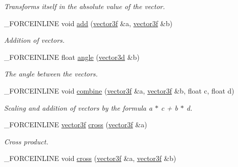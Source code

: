 \begin{DoxyCompactItemize}
\begin{DoxyCompactList}\small\item\em Transforms itself in the absolute value of the vector. \end{DoxyCompactList}\item 
\hypertarget{classbt_1_1vector3f_a5d6b329f5b2a2935d714a789af205f5a}{\-\_\-\-F\-O\-R\-C\-E\-I\-N\-L\-I\-N\-E void \hyperlink{classbt_1_1vector3f_a5d6b329f5b2a2935d714a789af205f5a}{add} (\hyperlink{classbt_1_1vector3f}{vector3f} \&a, \hyperlink{classbt_1_1vector3f}{vector3f} \&b)}\label{classbt_1_1vector3f_a5d6b329f5b2a2935d714a789af205f5a}

\begin{DoxyCompactList}\small\item\em Addition of vectors. \end{DoxyCompactList}\item 
\hypertarget{classbt_1_1vector3f_ae4e237c6a19867162c2dbfa2b7a16cfb}{\-\_\-\-F\-O\-R\-C\-E\-I\-N\-L\-I\-N\-E float \hyperlink{classbt_1_1vector3f_ae4e237c6a19867162c2dbfa2b7a16cfb}{angle} (\hyperlink{classbt_1_1vector3d}{vector3d} \&b)}\label{classbt_1_1vector3f_ae4e237c6a19867162c2dbfa2b7a16cfb}

\begin{DoxyCompactList}\small\item\em The angle between the vectors. \end{DoxyCompactList}\item 
\hypertarget{classbt_1_1vector3f_a82d7e9541cdad6f083b29c65e2d8a93a}{\-\_\-\-F\-O\-R\-C\-E\-I\-N\-L\-I\-N\-E void \hyperlink{classbt_1_1vector3f_a82d7e9541cdad6f083b29c65e2d8a93a}{combine} (\hyperlink{classbt_1_1vector3f}{vector3f} \&a, \hyperlink{classbt_1_1vector3f}{vector3f} \&b, float c, float d)}\label{classbt_1_1vector3f_a82d7e9541cdad6f083b29c65e2d8a93a}

\begin{DoxyCompactList}\small\item\em Scaling and addition of vectors by the formula a $\ast$ c + b $\ast$ d. \end{DoxyCompactList}\item 
\hypertarget{classbt_1_1vector3f_a2de99faae5d7418ad34cc9a8d6611c0d}{\-\_\-\-F\-O\-R\-C\-E\-I\-N\-L\-I\-N\-E \hyperlink{classbt_1_1vector3f}{vector3f} \hyperlink{classbt_1_1vector3f_a2de99faae5d7418ad34cc9a8d6611c0d}{cross} (\hyperlink{classbt_1_1vector3f}{vector3f} \&a)}\label{classbt_1_1vector3f_a2de99faae5d7418ad34cc9a8d6611c0d}

\begin{DoxyCompactList}\small\item\em Cross product. \end{DoxyCompactList}\item 
\hypertarget{classbt_1_1vector3f_a4915d3e8a29a970f25f2d1a943548dbc}{\-\_\-\-F\-O\-R\-C\-E\-I\-N\-L\-I\-N\-E void \hyperlink{classbt_1_1vector3f_a4915d3e8a29a970f25f2d1a943548dbc}{cross} (\hyperlink{classbt_1_1vector3f}{vector3f} \&a, \hyperlink{classbt_1_1vector3f}{vector3f} \&b)}\label{classbt_1_1vector3f_a4915d3e8a29a970f25f2d1a943548dbc}


\end{DoxyCompactItemize}
